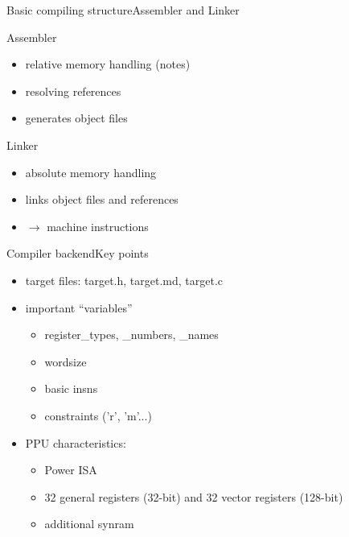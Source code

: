 \documentclass[10pt]{beamer}
\begin{document}
\begin{frame}{Basic compiling structure}{Assembler and Linker}
    \begin{block}{Assembler}
       	\begin{itemize}
		\item relative memory handling (notes)
		\item resolving references
		\item generates object files
       	\end{itemize}
    \end{block}
    \begin{block}{Linker}
	\begin{itemize}
       		\item absolute memory handling
       		\item links object files and references
       		\item $\rightarrow$ machine instructions
       	\end{itemize}
    \end{block}
\end{frame}

\begin{frame}[fragile]{Compiler backend}{Key points}
	\begin{itemize}
		\item target files: target.h, target.md, target.c
		\item important ``variables''
			\begin{itemize}
				\item register\_types, \_numbers, \_names
				\item wordsize
				\item basic insns
				\item constraints ('r', 'm'...)
			\end{itemize}
		\item PPU characteristics:
			\begin{itemize}
				\item Power ISA
				\item 32 general registers (32-bit) and 32 vector registers (128-bit)
				\item additional synram
			\end{itemize}
 	\end{itemize}
\end{frame}
\end{document}
